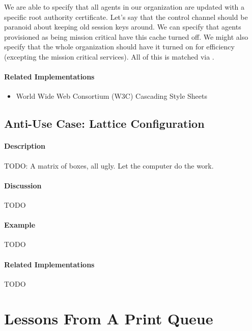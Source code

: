 We are able to specify that all agents in our organization are updated with a specific root authority certificate.  Let's say that the control channel should be paranoid about keeping old session keys around.  We can specify that agents provisioned as being mission critical have this cache turned off.  We might also specify that the whole organization should have it turned on for efficiency (excepting the mission critical services).  All of this is matched via \resources{}.

\paragraph{Related Implementations}

\begin{itemize}
        \item World Wide Web Consortium (W3C) Cascading Style Sheets
\end{itemize}

\subsection{Anti-Use Case: Lattice Configuration}

\paragraph{Description}

{\Large TODO:} A matrix of boxes, all ugly.  Let the computer do the work.

\paragraph{Discussion}

{\Large TODO}

\paragraph{Example}

{\Large TODO}

\paragraph{Related Implementations}

{\Large TODO}

\section{Lessons From A Print Queue}

